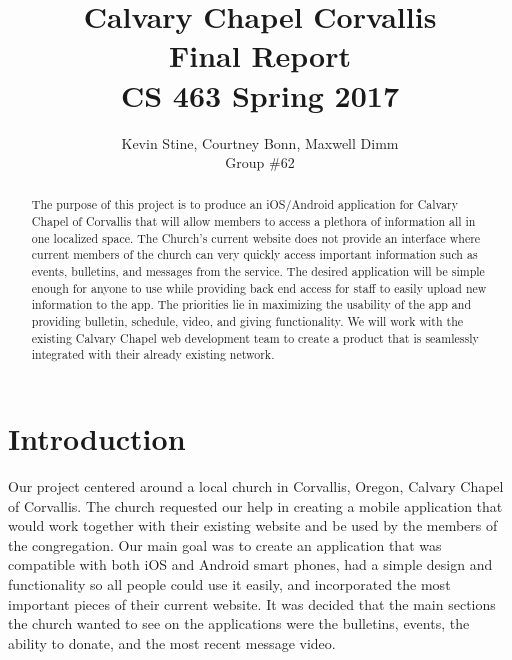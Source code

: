 \documentclass[letterpaper,10pt,draftclsnofoot,onecolumn,titlepage]{IEEEtran}
\def\name{Kevin Stine, Courtney Bonn, Maxwell Dimm}
\def\team{Calvary Chapel Corvallis}
\def\grp{Group \#62}
\begin{document}
	\title{\huge \team \\ Final Report\\ CS 463 Spring 2017}
	\author{\large \name \\ \grp}



	\maketitle

		\begin{abstract}The purpose of this project is to produce an \gls{iOS}/\gls{Android} application for Calvary Chapel of Corvallis that will allow members to access a plethora of information all in one localized space.
		The Church's current website does not provide an interface where current members of the church can very quickly access important information such as events, bulletins, and messages from the service.
		The desired application will be simple enough for anyone to use while providing back end access for staff to easily upload new information to the app.
		The priorities lie in maximizing the usability of the app and providing bulletin, schedule, video, and giving functionality.
		We will work with the existing Calvary Chapel web development team to create a product that is seamlessly integrated with their already existing network.
		\end{abstract}

		\clearpage
		
		\tableofcontents
		
		\clearpage

\section{Introduction}

Our project centered around a local church in Corvallis, Oregon, Calvary Chapel of Corvallis. 
The church requested our help in creating a mobile application that would work together with their existing website and be used by the members of the congregation. 
Our main goal was to create an application that was compatible with both iOS and Android smart phones, had a simple design and functionality so all people could use it easily, and incorporated the most important pieces of their current website.
It was decided that the main sections the church wanted to see on the applications were the bulletins, events, the ability to donate, and the most recent message video. 
\end{document}
